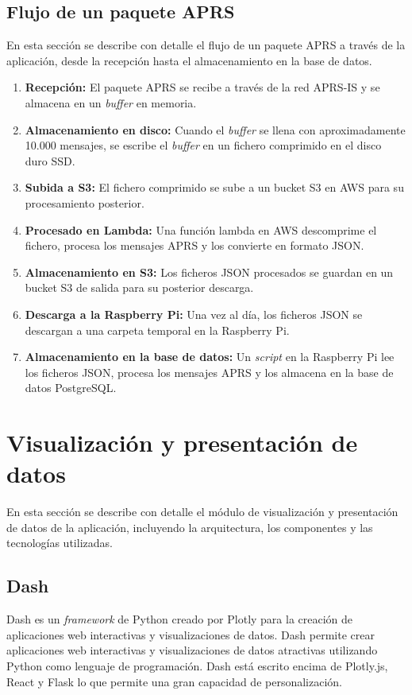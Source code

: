 \FloatBarrier

\subsection{Flujo de un paquete APRS}
En esta sección se describe con detalle el flujo de un paquete APRS a través de la aplicación, desde la recepción hasta el almacenamiento en la base de datos.
\begin{enumerate}
	\item \textbf{Recepción:} El paquete APRS se recibe a través de la red APRS-IS y se almacena en un \textit{buffer} en memoria.
	\item \textbf{Almacenamiento en disco:} Cuando el \textit{buffer} se llena con aproximadamente 10.000 mensajes, se escribe el \textit{buffer} en un fichero comprimido en el disco duro SSD.
	\item \textbf{Subida a S3:} El fichero comprimido se sube a un bucket S3 en AWS para su procesamiento posterior.
	\item \textbf{Procesado en Lambda:} Una función lambda en AWS descomprime el fichero, procesa los mensajes APRS y los convierte en formato JSON.
	\item \textbf{Almacenamiento en S3:} Los ficheros JSON procesados se guardan en un bucket S3 de salida para su posterior descarga.
	\item \textbf{Descarga a la Raspberry Pi:} Una vez al día, los ficheros JSON se descargan a una carpeta temporal en la Raspberry Pi.
	\item \textbf{Almacenamiento en la base de datos:} Un \textit{script} en la Raspberry Pi lee los ficheros JSON, procesa los mensajes APRS y los almacena en la base de datos PostgreSQL.
\end{enumerate}


\section{Visualización y presentación de datos}

En esta sección se describe con detalle el módulo de visualización y presentación de datos de la aplicación, incluyendo la arquitectura, los componentes y las tecnologías utilizadas.

\subsection{Dash}
Dash es un \textit{framework} de Python creado por Plotly para la creación de aplicaciones web interactivas y visualizaciones de datos. Dash permite crear aplicaciones web interactivas y visualizaciones de datos atractivas utilizando Python como lenguaje de programación. Dash está escrito encima de Plotly.js, React y Flask lo que permite una gran capacidad de personalización.

